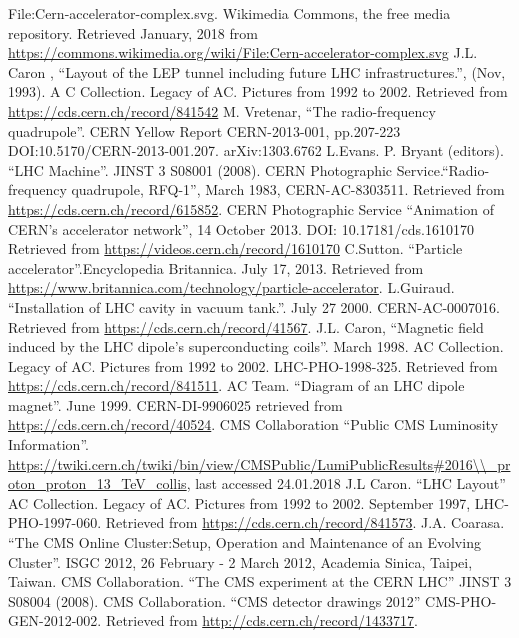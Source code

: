 \documentclass[print]{nuthesis}
\begin{document}
\begin{thebibliography}{300}
 File:Cern-accelerator-complex.svg. Wikimedia Commons, the free media repository. Retrieved January, 2018 from \url{https://commons.wikimedia.org/wiki/File:Cern-accelerator-complex.svg}
 J.L. Caron , ``Layout of the LEP tunnel including future LHC infrastructures.'', (Nov, 1993). A C Collection. Legacy of AC. Pictures from 1992 to 2002. Retrieved from \url{https://cds.cern.ch/record/841542}
 M. Vretenar, ``The radio-frequency quadrupole''. CERN Yellow Report CERN-2013-001, pp.207-223 DOI:10.5170/CERN-2013-001.207. arXiv:1303.6762
 L.Evans. P. Bryant (editors). ``LHC Machine''. JINST 3 S08001 (2008).
 CERN Photographic Service.``Radio-frequency quadrupole, RFQ-1'', March 1983, CERN-AC-8303511. Retrieved from \url{https://cds.cern.ch/record/615852}.
 CERN Photographic Service ``Animation of CERN's accelerator network'', 14 October 2013. DOI: 10.17181/cds.1610170 Retrieved from \url{https://videos.cern.ch/record/1610170}
 C.Sutton. ``Particle accelerator''.Encyclopedia Britannica. July 17, 2013. Retrieved from \url{https://www.britannica.com/technology/particle-accelerator}.
 L.Guiraud. ``Installation of LHC cavity in vacuum tank.''. July 27 2000. CERN-AC-0007016. Retrieved from \url{https://cds.cern.ch/record/41567}.
 J.L. Caron, ``Magnetic field induced by the LHC dipole's superconducting coils''. March 1998. AC Collection. Legacy of AC. Pictures from 1992 to 2002. LHC-PHO-1998-325. Retrieved from \url{https://cds.cern.ch/record/841511}.
 AC Team. ``Diagram of an LHC dipole magnet''. June 1999. CERN-DI-9906025 retrieved from \url{https://cds.cern.ch/record/40524}. 
 CMS Collaboration ``Public CMS Luminosity Information''. \url{https://twiki.cern.ch/twiki/bin/view/CMSPublic/LumiPublicResults\#2016\\\_proton\_proton\_13\_TeV\_collis}, last accessed 24.01.2018
 J.L Caron. ``LHC Layout'' AC Collection. Legacy of AC. Pictures from 1992 to 2002. September 1997, LHC-PHO-1997-060. Retrieved from \url{https://cds.cern.ch/record/841573}.
J.A. Coarasa. ``The CMS Online Cluster:Setup, Operation and Maintenance of an Evolving Cluster''. ISGC 2012, 26 February - 2 March 2012, Academia Sinica, Taipei, Taiwan.
 CMS Collaboration. ``The CMS experiment at the CERN LHC'' JINST 3 S08004 (2008).
 CMS Collaboration. ``CMS detector drawings 2012'' CMS-PHO-GEN-2012-002. Retrieved from \url{http://cds.cern.ch/record/1433717}.

\end{thebibliography}
\end{document}
